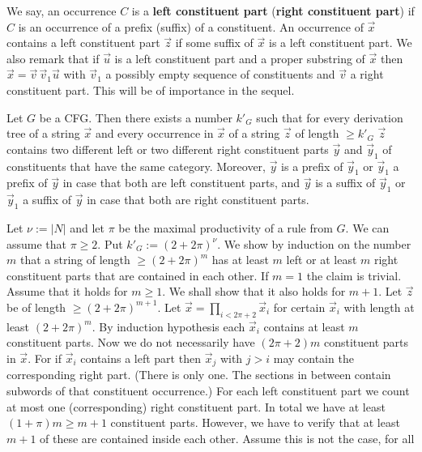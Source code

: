 We say, an occurrence $C$ is a \textbf{left constituent part} 
(\textbf{right constituent part}) if $C$ is an occurrence of 
a prefix (suffix) of a constituent.  An occurrence of $\vec{x}$ 
contains a left constituent part $\vec{z}$ if some suffix of 
$\vec{x}$ is a left constituent part.  We also remark that 
if $\vec{u}$ is a left constituent part and a proper substring 
of $\vec{x}$ then $\vec{x} = \vec{v}\,\vec{v}_1\vec{u}$ with 
$\vec{v}_1$ a possibly empty sequence of constituents and 
$\vec{v}$ a right constituent part. This will 
be of importance in the sequel.
\begin{lem}
\label{lem:halb}
Let $G$ be a  CFG. Then there exists a number $k'_G$ such that 
for every derivation tree of a string $\vec{x}$ and every occurrence 
in $\vec{x}$ of a string $\vec{z}$ of length $\geq k'_G$ 
$\vec{z}$ contains two different left or two different right 
constituent parts $\vec{y}$ and $\vec{y}_1$ of constituents that 
have the same category. Moreover, $\vec{y}$ is a prefix 
of $\vec{y}_1$ or $\vec{y}_1$ a prefix of $\vec{y}$ in case that 
both are left constituent parts, and $\vec{y}$ is a suffix of 
$\vec{y}_1$ or $\vec{y}_1$ a suffix of $\vec{y}$ in case that both 
are right constituent parts.
\end{lem}
\proofbeg
Let $\nu := |N|$ and let $\pi$ be the maximal productivity of a rule from
$G$.  We can assume that $\pi \geq 2$. Put $k'_G := (2 + 2\pi)^{\nu}$.
We show by induction on the number $m$ that a string of length
$\geq (2+ 2\pi)^m$ has at least $m$ left or at least $m$ right
constituent parts that are contained in each other. If $m = 1$
the claim is trivial. Assume that it holds for $m \geq 1$. We shall 
show that it also holds for $m+1$.  Let $\vec{z}$ be of length 
$\geq (2+2\pi)^{m+1}$. Let $\vec{x} = \prod_{i < 2\pi+2} \vec{x}_i$ 
for certain $\vec{x}_i$ with length at least $(2 + 2\pi)^m$. By 
induction hypothesis each $\vec{x}_i$ contains at least $m$ constituent
parts. Now we do not necessarily have $(2\pi +2)m$ constituent
parts in $\vec{x}$. For if $\vec{x}_i$ contains a left part then
$\vec{x}_j$ with $j > i$ may contain the corresponding right part.
(There is only one. The sections in between contain subwords of
that constituent occurrence.) For each left constituent part
we count at most one (corresponding) right constituent part.
In total we have at least $(1 + \pi)m \geq m+1$ constituent parts.
However,  we have to verify  that at least $m+1$ of these are
contained inside each other. Assume  this is not the case, for all
